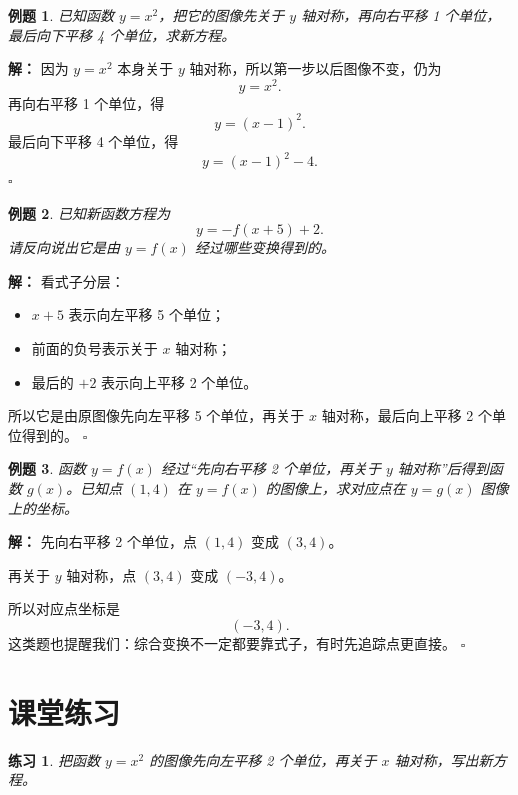 \documentclass[11pt,a4paper,fontset=fandol]{ctexart}
\theoremstyle{formaltheorem}
\theoremstyle{formalexample}
\newtheorem{example}{例题}[section]
\newtheorem{exercise}{练习}[section]
\newenvironment{solution}{\par\noindent\textbf{解：}}{\hfill$\square$\par}
\begin{document}
\begin{example}
已知函数 \(y=x^2\)，把它的图像先关于 \(y\) 轴对称，再向右平移 1 个单位，最后向下平移 4 个单位，求新方程。
\end{example}

\begin{solution}
因为 \(y=x^2\) 本身关于 \(y\) 轴对称，所以第一步以后图像不变，仍为
\[
y=x^2.
\]
再向右平移 1 个单位，得
\[
y=(x-1)^2.
\]
最后向下平移 4 个单位，得
\[
y=(x-1)^2-4.
\]
\end{solution}

\begin{example}
已知新函数方程为
\[
y=-f(x+5)+2.
\]
请反向说出它是由 \(y=f(x)\) 经过哪些变换得到的。
\end{example}

\begin{solution}
看式子分层：
\begin{itemize}
  \item \(x+5\) 表示向左平移 5 个单位；
  \item 前面的负号表示关于 \(x\) 轴对称；
  \item 最后的 \(+2\) 表示向上平移 2 个单位。
\end{itemize}
所以它是由原图像先向左平移 5 个单位，再关于 \(x\) 轴对称，最后向上平移 2 个单位得到的。
\end{solution}

\begin{example}
函数 \(y=f(x)\) 经过“先向右平移 2 个单位，再关于 \(y\) 轴对称”后得到函数 \(g(x)\)。已知点 \((1,4)\) 在 \(y=f(x)\) 的图像上，求对应点在 \(y=g(x)\) 图像上的坐标。
\end{example}

\begin{solution}
先向右平移 2 个单位，点 \((1,4)\) 变成 \((3,4)\)。

再关于 \(y\) 轴对称，点 \((3,4)\) 变成 \((-3,4)\)。

所以对应点坐标是
\[
(-3,4).
\]
这类题也提醒我们：综合变换不一定都要靠式子，有时先追踪点更直接。
\end{solution}

\section{课堂练习}

\begin{exercise}
把函数 \(y=x^2\) 的图像先向左平移 2 个单位，再关于 \(x\) 轴对称，写出新方程。
\end{exercise}
\end{document}
